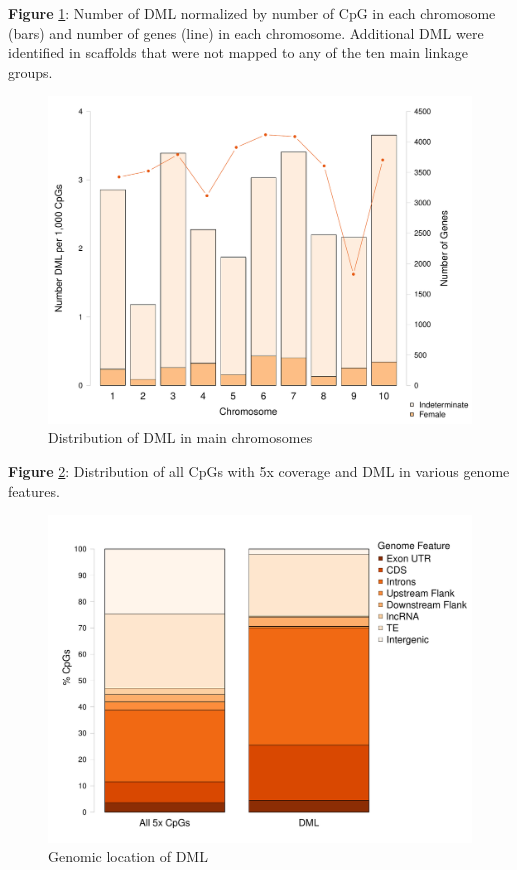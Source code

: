 \documentclass [11pt, proquest] {uwthesis}[2015/03/03]
\begin{document}
\textbf{Figure} \ref{fig:chromdistr}: Number of DML normalized by number of CpG in each chromosome (bars) and number of genes (line) in each chromosome. Additional DML were identified in scaffolds that were not mapped to any of the ten main linkage groups.\newline 
\begin{figure}[h]
\centering
  \includegraphics[width=1\textwidth]{figure/Ch3/Figure3.3.pdf}
  \caption{Distribution of DML in main chromosomes}
  \label{fig:chromdistr}
\end{figure}
\clearpage

\textbf{Figure} \ref{fig:locDML}: Distribution of all CpGs with 5x coverage and DML in various genome features.\newline 
\begin{figure}[h]
\centering
  \includegraphics[width=1\textwidth]{figure/Ch3/Figure3.4.pdf}
  \caption{Genomic location of DML}
  \label{fig:locDML}
\end{figure}
\clearpage
\end{document}

